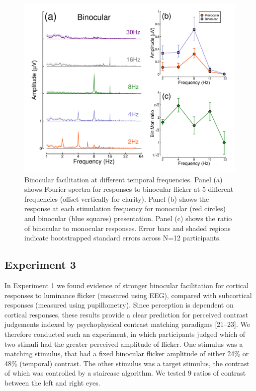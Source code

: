 \documentclass[
]{article}
\begin{document}
\begin{figure}

{\centering \includegraphics{Figures/TFdata} 

}

\caption{Binocular facilitation at different temporal frequencies. Panel (a) shows Fourier spectra for responses to binocular flicker at 5 different frequencies (offset vertically for clarity). Panel (b) shows the response at each stimulation frequency for monocular (red circles) and binocular (blue squares) presentation. Panel (c) shows the ratio of binocular to monocular responses. Error bars and shaded regions indicate bootstrapped standard errors across N=12 participants.}\label{fig:TFdata}
\end{figure}

\hypertarget{experiment-3}{%
\subsection{Experiment 3}\label{experiment-3}}

In Experiment 1 we found evidence of stronger binocular facilitation for cortical responses to luminance flicker (measured using EEG), compared with subcortical responses (measured using pupillometry). Since perception is dependent on cortical responses, these results provide a clear prediction for perceived contrast judgements indexed by psychophysical contrast matching paradigms {[}21--23{]}. We therefore conducted such an experiment, in which participants judged which of two stimuli had the greater perceived amplitude of flicker. One stimulus was a matching stimulus, that had a fixed binocular flicker amplitude of either 24\% or 48\% (temporal) contrast. The other stimulus was a target stimulus, the contrast of which was controlled by a staircase algorithm. We tested 9 ratios of contrast between the left and right eyes.
\end{document}
